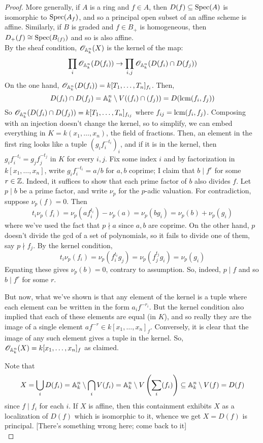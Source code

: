 \begin{proof}
	More generally, if $A$ is a ring and $f \in A$, then $D(f) \subseteq \Spec(A)$ is isomorphic to $\Spec(A_f)$, and so a principal open subset of an affine scheme is affine. Similarly, if $B$ is graded and $f \in B_{+}$ is homogeneous, then $D_{+}(f) \cong \Spec(B_{(f)})$ and so is also affine. \\
	
	By the sheaf condition, $\scO_{\AA_k^n}(X)$ is the kernel of the map:
	\[ \prod_i \scO_{\AA_k^n}(D(f_i)) \to \prod_{i,j} \scO_{\AA_k^n}(D(f_i) \cap D(f_j)) \]
	On the one hand, $\scO_{\AA_k^n}(D(f_i)) = k[T_1,\ldots,T_n]_{f_i}$. Then,
	\[ D(f_i) \cap D(f_j) = \AA_k^n \setminus V((f_i) \cap (f_j)) = D(\lcm(f_i,f_j)) \]
	So $\scO_{\AA_k^n}(D(f_i) \cap D(f_j)) = k[T_1,\ldots,T_n]_{f_{ij}}$ where $f_{ij} = \lcm(f_i,f_j)$. Composing with an injection doesn't change the kernel, so to simplify, we can embed everything in $K = k(x_1,\ldots,x_n)$, the field of fractions. Then, an element in the first ring looks like a tuple $(g_if_i^{-t_i})_i$, and if it is in the kernel, then $g_if_i^{-t_i} = g_jf_j^{-t_j}$ in $K$ for every $i,j$. Fix some index $i$ and by factorization in $k[x_1,\ldots,x_n]$, write $g_if_i^{-t_i} = a/b$ for $a,b$ coprime; I claim that $b \mid f^r$ for some $r \in \ZZ$. Indeed, it suffices to show that each prime factor of $b$ also divides $f$. Let $p \mid b$ be a prime factor, and write $\nu_p$ for the $p$-adic valuation. For contradiction, suppose $\nu_p(f)=0$. Then
	\[ t_i\nu_p(f_i) = \nu_p(af_i^{t_i}) - \nu_p(a) = \nu_p(bg_i) = \nu_p(b)+\nu_p(g_i) \]
	where we've used the fact that $p \nmid a$ since $a,b$ are coprime. On the other hand, $p$ doesn't divide the gcd of a set of polynomials, so it fails to divide one of them, say $p \nmid f_j$. By the kernel condition,
	\[ t_i\nu_p(f_i) = \nu_p(f_i^{t_i}g_j) = \nu_p(f_j^{t_j}g_i) = \nu_p(g_i) \]
	Equating these gives $\nu_p(b) = 0$, contrary to assumption. So, indeed, $p \mid f$ and so $b \mid f^r$ for some $r$.
	
	But now, what we've shown is that any element of the kernel is a tuple where each element can be written in the form $a_if^{-r_i}$. But the kernel condition also implied that each of these elements are equal (in $K$), and so really they are the image of a single element $af^{-r} \in k[x_1,\ldots,x_n]_f$. Conversely, it is clear that the image of any such element gives a tuple in the kernel. So, $\scO_{\AA_k^n}(X) = k[x_1,\ldots,x_n]_f$ as claimed.
	
	Note that
	\[ X = \bigcup_i D(f_i) = \AA_k^n \setminus \bigcap_i V(f_i) = \AA_k^n \setminus V\left(\sum_i (f_i)\right) \subseteq \AA_k^n \setminus V(f) = D(f) \]
	since $f \mid f_i$ for each $i$. If $X$ is affine, then this containment exhibits $X$ as a localization of $D(f)$ which is isomorphic to it, whence we get $X = D(f)$ is principal. [There's something wrong here; come back to it] \\
	

\end{proof}
